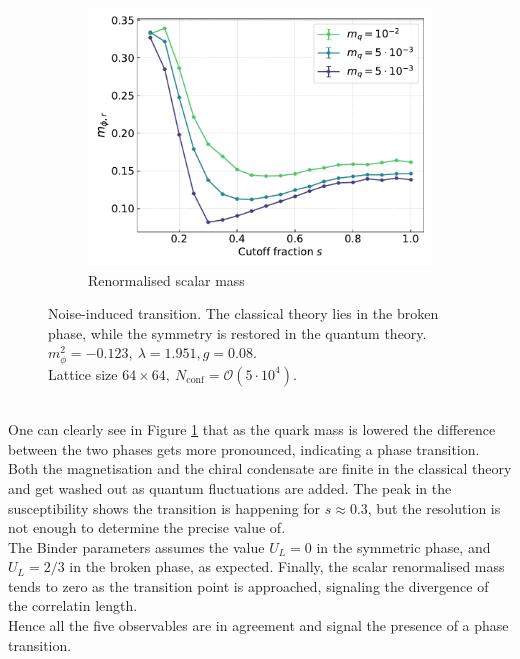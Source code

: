 \begin{figure}[h!]
\begin{subfigure}{0.49\textwidth}
    \includegraphics[width=\textwidth]{figures/chiral_PT/mphir.pdf}
    \caption{Renormalised scalar mass}
\end{subfigure}
\caption[Noise-induced transition]{Noise-induced transition. The classical theory lies in the broken phase, while the symmetry is restored in the quantum theory. \\ $m_\phi^2=-0.123, \ \lambda=1.951, g=0.08$. \\ Lattice size $64 \times 64, \ N_\text{conf} = \mathcal{O}(5 \cdot 10^4)$.}
\label{fig:chiral:symmetry_breaking}
\end{figure}\\
One can clearly see in Figure \ref{fig:chiral:symmetry_breaking} that as the quark  mass is lowered the difference between the two phases gets more pronounced, indicating a phase transition. \\
Both the magnetisation and the chiral condensate are finite in the classical theory and get washed out as quantum fluctuations are added. 
The peak in the susceptibility shows the transition is happening for $s \approx 0.3$, but the resolution is not enough to determine the precise value of. \\ 
The Binder parameters assumes the value $U_L = 0$ in the symmetric phase, and $U_L=2/3$ in the broken phase, as expected. Finally, the scalar renormalised mass tends to zero as the transition point is approached, signaling the divergence of the correlatin length. \\
Hence all the five observables are in agreement and signal the presence of a phase transition. \\
